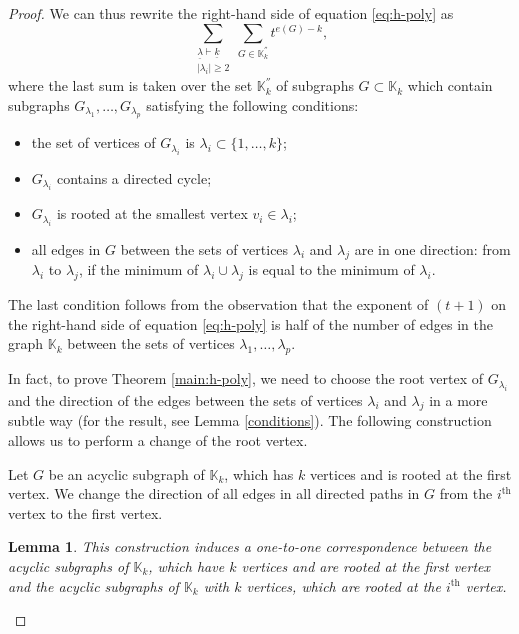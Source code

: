 \documentclass[11pt]{article}
\newtheorem{lemma}[theo]{Lemma}
\theoremstyle{definition}
\numberwithin{equation}{section}
\begin{document}
\begin{proof}
We can thus rewrite the right-hand side of equation \eqref{eq:h-poly} as 
\begin{equation}\label{rhsof12}
\sum_{\substack{\underline{\lambda}\vdash\underline{k} \\  |\lambda_i|\geq 2}} \sum_{G\in\mathbb{K}^{''}_k}t^{e(G)-k},
\end{equation}
where the last sum is taken over the set $ \mathbb{K}^{''}_k $ of subgraphs $G\subset \mathbb{K}_k$ which contain subgraphs $G_{\lambda_1}, \ldots ,G_{\lambda_p}$ satisfying the following conditions: 
\begin{itemize}
\item the set of vertices of $G_{\lambda_i}$ is $\lambda_i\subset\{1, \ldots ,k\}$;
\item $G_{\lambda_i}$ contains a directed cycle;
\item $G_{\lambda_i}$ is rooted at the smallest vertex $v_i\in\lambda_i$;
\item all edges in $G$ between the sets of vertices $\lambda_i$ and $\lambda_j$ are in one direction: from $\lambda_i$ to $\lambda_j$, if the minimum of $\lambda_i\cup \lambda_j$ is equal to the minimum of $\lambda_i$.
\end{itemize} 
The last condition follows from the observation that  the exponent of $(t+1)$ on the right-hand side of equation \eqref{eq:h-poly} is half of the number of edges in the graph $\mathbb{K}_k$ between the sets of vertices $\lambda_1, \ldots ,\lambda_p$. 

In fact, to prove Theorem \ref{main:h-poly}, we need to choose the root vertex of $G_{\lambda_i}$ and the direction of the edges between the sets of vertices $\lambda_i$ and $\lambda_j$ in a more subtle way (for the result, see Lemma \ref{conditions}). 
The following construction allows us to perform a change of the root vertex. 

\begin{constr}[roots]
\label{construction:roots} Let $G$ be 
an acyclic subgraph of $\mathbb{K}_k$, which has $k$ vertices and is rooted at 
the first vertex. We change the direction of all edges in all directed paths in 
$G$ from the $i^{\mathrm{th}}$ vertex to the first vertex. 
\end{constr}

\begin{lemma}\label{redvertex}
This construction induces a one-to-one correspondence between the acyclic subgraphs of $\mathbb{K}_k$, which have $k$ vertices and are rooted at the first vertex and the acyclic subgraphs of $\mathbb{K}_k$  with $k$ vertices, which are rooted at the $i^{\mathrm{th}}$ vertex. 
\end{lemma}


\end{proof}
\end{document}
